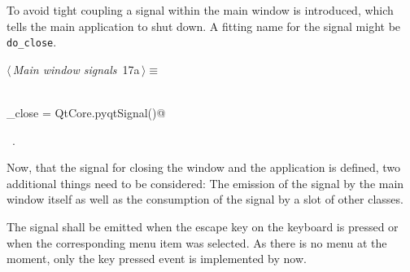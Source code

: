 \documentclass[
    a4paper,      %
    10pt,         %
    openright,    %
    notitlepage,  %
    parskip=half, %
]{scrreprt}       %
\theoremstyle{definition}                    %
\begin{document}
To avoid tight coupling a signal within the main window is introduced, which
tells the main application to shut down. A fitting name for the signal might be
\verb=do_close=.

\begin{flushleft} \small
\begin{minipage}{\linewidth}\label{scrap6}\raggedright\small
{} $\langle\,${\itshape Main window signals}\nobreak\ {\footnotesize {17a}}$\,\rangle\equiv$
\vspace{-1ex}
\begin{list}{}{} \item
\mbox{}\lstinline@@\\
\mbox{}\lstinline@do_close = QtCore.pyqtSignal()@\\
\mbox{}\lstinline@@{\NWsep}
\end{list}
\vspace{-1.5ex}
\footnotesize
\begin{list}{}{\setlength{\itemsep}{-\parsep}\setlength{\itemindent}{-\leftmargin}}
\item \NWtxtMacroRefIn\ .

\item{}
\end{list}
\end{minipage}\vspace{4ex}
\end{flushleft}
Now, that the signal for closing the window and the application is defined, two
additional things need to be considered: The emission of the signal by
the main window itself as well as the consumption of the signal by a slot of
other classes.

The signal shall be emitted when the escape key on the keyboard is pressed or
when the corresponding menu item was selected. As there is no menu at the
moment, only the key pressed event is implemented by now.
\end{document}
